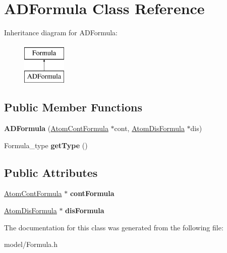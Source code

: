 \hypertarget{classADFormula}{\section{A\-D\-Formula Class Reference}
\label{classADFormula}
}
Inheritance diagram for A\-D\-Formula\-:\begin{figure}[H]
\begin{center}
\leavevmode
\includegraphics[height=2.000000cm]{classADFormula}
\end{center}
\end{figure}
\subsection*{Public Member Functions}
\begin{DoxyCompactItemize}
\item 
\hypertarget{classADFormula_a38f6414a37db523ad0aa8d162912af2d}{{\bfseries A\-D\-Formula} (\hyperlink{classAtomContFormula}{Atom\-Cont\-Formula} $\ast$cont, \hyperlink{classAtomDisFormula}{Atom\-Dis\-Formula} $\ast$dis)}\label{classADFormula_a38f6414a37db523ad0aa8d162912af2d}

\item 
\hypertarget{classADFormula_a9b4c832de720b908226fe618f1f3c4a5}{Formula\-\_\-type {\bfseries get\-Type} ()}\label{classADFormula_a9b4c832de720b908226fe618f1f3c4a5}

\end{DoxyCompactItemize}
\subsection*{Public Attributes}
\begin{DoxyCompactItemize}
\item 
\hypertarget{classADFormula_a1ecce42177dbf52c447e2e8aa1316848}{\hyperlink{classAtomContFormula}{Atom\-Cont\-Formula} $\ast$ {\bfseries cont\-Formula}}\label{classADFormula_a1ecce42177dbf52c447e2e8aa1316848}

\item 
\hypertarget{classADFormula_a5d468953085cf2fb857eca9851c3e107}{\hyperlink{classAtomDisFormula}{Atom\-Dis\-Formula} $\ast$ {\bfseries dis\-Formula}}\label{classADFormula_a5d468953085cf2fb857eca9851c3e107}

\end{DoxyCompactItemize}


The documentation for this class was generated from the following file\-:\begin{DoxyCompactItemize}
\item 
model/Formula.\-h\end{DoxyCompactItemize}

